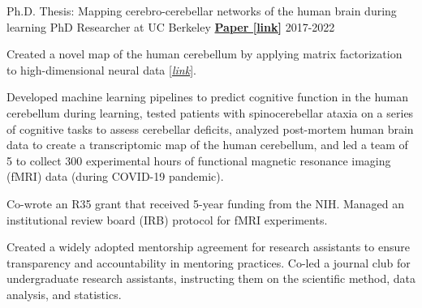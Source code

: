 \begin{cventries}
  \cventry
    {Ph.D. Thesis: Mapping cerebro-cerebellar networks of the human brain during learning}
    {PhD Researcher at UC Berkeley} %
    {\href{http://ivrylab.berkeley.edu/uploads/4/1/1/5/41152143/functional_boundaries_in_the_human_cerebellum.pdf}{\textbf{Paper [link]}}}
    {2017-2022} %
    {
      \begin{cvitems} %
            	\item {Created a novel map of the human cerebellum by applying matrix factorization to high-dimensional neural data {\href{http://www.diedrichsenlab.org/imaging/mdtb.htm}		{[\textit{link}}]}.}
        \item {Developed machine learning pipelines to predict cognitive function in the human cerebellum during learning, tested patients with spinocerebellar ataxia on a series of cognitive tasks to assess cerebellar deficits, analyzed post-mortem  human brain data to create a transcriptomic map of the human cerebellum, and led a team of 5 to collect 300 experimental hours of functional magnetic resonance imaging (fMRI) data (during COVID-19 pandemic).}
        \item {Co-wrote an R35 grant that received 5-year funding from the NIH. Managed an institutional review board (IRB) protocol for fMRI experiments.}
        \item {Created a widely adopted mentorship agreement for research assistants to ensure transparency and accountability in mentoring practices. Co-led a journal club for undergraduate research assistants, instructing them on the scientific method, data analysis, and statistics.}
      \end{cvitems}
    }
    
\end{cventries}
